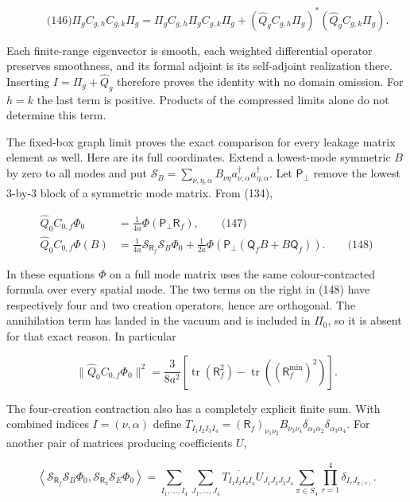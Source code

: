 \[
\qquad\text{(146)}
 \Pi_g C_{g,h}C_{g,k}\Pi_g
 =\Pi_gC_{g,h}\Pi_gC_{g,k}\Pi_g+
       (\widehat Q_gC_{g,h}\Pi_g)^*
                        (\widehat Q_gC_{g,k}\Pi_g).
\]

Each finite-range eigenvector is smooth, each weighted differential
operator preserves smoothness, and its formal adjoint is its
self-adjoint realization there. Inserting \(I=\Pi_g+\widehat Q_g\)
therefore proves the identity with no domain omission. For \(h=k\) the
last term is positive. Products of the compressed limits alone do not
determine this term.

The fixed-box graph limit proves the exact comparison for every leakage
matrix element as well. Here are its full coordinates. Extend a
lowest-mode symmetric \(B\) by zero to all modes and put
\(\mathcal S_B= \sum_{\nu,\eta,\alpha}
B_{\nu\eta}a_{\nu,\alpha}^\dagger a_{\eta,\alpha}^\dagger\). Let
\(\mathsf P_\perp\) remove the lowest \(3\)-by-\(3\) block of a
symmetric mode matrix. From (134),

\[
\begin{aligned}
 \widehat Q_0C_{0,f}\Phi_0
 &=\frac1{4a}\Phi(\mathsf P_\perp\mathsf R_f),
 \qquad\text{(147)}\\
 \widehat Q_0C_{0,f}\Phi(B)
 &=\frac1{4a}\mathcal S_{\mathsf R_f}\mathcal S_B\Phi_0
 +\frac1{2a}
 \Phi\!\left(\mathsf P_\perp(\mathsf Q_fB+B\mathsf Q_f)\right).
 \qquad\text{(148)}
\end{aligned}
\]

In these equations \(\Phi\) on a full mode matrix uses the same
colour-contracted formula over every spatial mode. The two terms on the
right in (148) have respectively four and two creation operators, hence
are orthogonal. The annihilation term has landed in the vacuum and is
included in \(\Pi_0\), so it is absent for that exact reason. In
particular

\[
\|\widehat Q_0C_{0,f}\Phi_0\|^2
 =\frac3{8a^2}\left[
 \operatorname{tr}(\mathsf R_f^2)
           -\operatorname{tr}((\mathsf R_f^{\min})^2)\right].
\]

The four-creation contraction also has a completely explicit finite sum.
With combined indices \(I=(\nu,\alpha)\) define \(T_{I_1I_2I_3I_4}
=(\mathsf R_f)_{\nu_1\nu_2}B_{\nu_3\nu_4}
\delta_{\alpha_1\alpha_2}\delta_{\alpha_3\alpha_4}\). For another pair
of matrices producing coefficients \(U\),

\[
\left\langle\mathcal S_{\mathsf R_f}\mathcal S_B\Phi_0,
              \mathcal S_{\mathsf R_k}\mathcal S_E\Phi_0\right\rangle
 =\sum_{I_1,\ldots,I_4}\sum_{J_1,\ldots,J_4}
 \overline{T_{I_1I_2I_3I_4}}U_{J_1J_2J_3J_4}
 \sum_{\pi\in S_4}\prod_{r=1}^4\delta_{I_rJ_{\pi(r)}}.
\]

